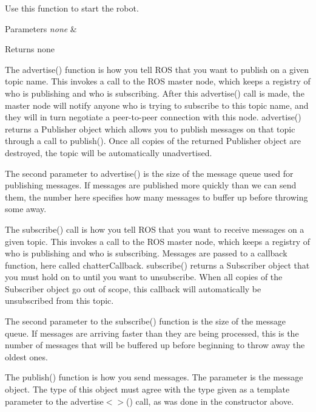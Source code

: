 Use this function to start the robot. 


\begin{DoxyParams}{Parameters}
{\em none} & \\
\hline
\end{DoxyParams}
\begin{DoxyReturn}{Returns}
none 
\end{DoxyReturn}
The advertise() function is how you tell R\+OS that you want to publish on a given topic name. This invokes a call to the R\+OS master node, which keeps a registry of who is publishing and who is subscribing. After this advertise() call is made, the master node will notify anyone who is trying to subscribe to this topic name, and they will in turn negotiate a peer-\/to-\/peer connection with this node. advertise() returns a Publisher object which allows you to publish messages on that topic through a call to publish(). Once all copies of the returned Publisher object are destroyed, the topic will be automatically unadvertised.

The second parameter to advertise() is the size of the message queue used for publishing messages. If messages are published more quickly than we can send them, the number here specifies how many messages to buffer up before throwing some away.

The subscribe() call is how you tell R\+OS that you want to receive messages on a given topic. This invokes a call to the R\+OS master node, which keeps a registry of who is publishing and who is subscribing. Messages are passed to a callback function, here called chatter\+Callback. subscribe() returns a Subscriber object that you must hold on to until you want to unsubscribe. When all copies of the Subscriber object go out of scope, this callback will automatically be unsubscribed from this topic.

The second parameter to the subscribe() function is the size of the message queue. If messages are arriving faster than they are being processed, this is the number of messages that will be buffered up before beginning to throw away the oldest ones.

The publish() function is how you send messages. The parameter is the message object. The type of this object must agree with the type given as a template parameter to the advertise$<$$>$() call, as was done in the constructor above.\mbox{\label{classExplorer_a99a6215e70f2449189b0a3cb7ec12994}} 
